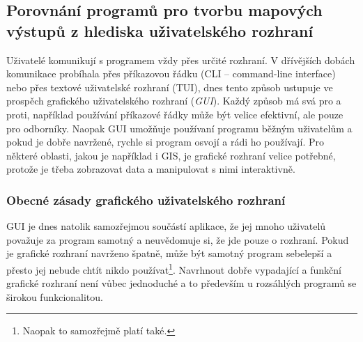 \documentclass[a4paper,12pt,draft]{article}
\begin{document}
\subsection{Porovnání programů pro tvorbu mapových výstupů z hlediska
uživatelského rozhraní}
Uživatelé komunikují s programem vždy přes určité rozhraní. V
dřívějších dobách komunikace probíhala přes příkazovou
řádku (CLI -- command-line interface) nebo přes textové uživatelské
rozhraní (TUI), dnes tento způsob ustupuje ve prospěch grafického
uživatelského
rozhraní (\emph{GUI}). Každý způsob má svá pro a proti, například
používání příkazové řádky může být velice efektivní, ale pouze
pro odborníky. Naopak GUI umožňuje používaní programu běžným
uživatelům a pokud je dobře navržené, rychle si program osvojí a
rádi ho používají. Pro některé oblasti, jakou je například i GIS,
je grafické rozhraní velice potřebné, protože je třeba zobrazovat data
a manipulovat s nimi interaktivně.

\subsubsection{Obecné zásady grafického uživatelského rozhraní}
GUI je dnes natolik samozřejmou součástí aplikace, že jej mnoho
uživatelů považuje za program samotný a neuvědomuje si, že jde
pouze o rozhraní. Pokud je grafické rozhraní navrženo špatně,
může být samotný program sebelepší a přesto jej nebude chtít nikdo
používat\footnote{Naopak to samozřejmě platí také.}. Navrhnout dobře
vypadající a funkční grafické rozhraní není vůbec jednoduché a to
především u rozsáhlých programů se širokou funkcionalitou.
\end{document}
